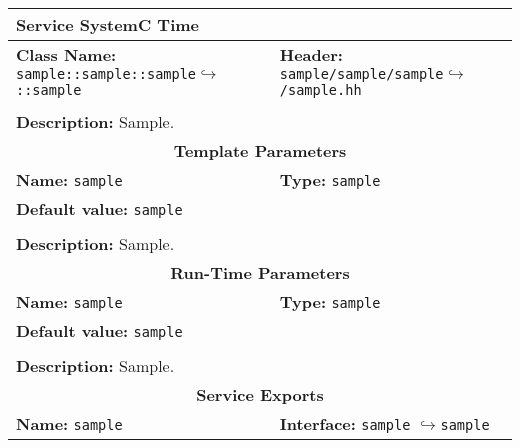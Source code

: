 \newpage
\begin{center}
	\begin{tabular}{|p{7.5cm}|p{7.5cm}|}
		\hline
		\multicolumn{2}{|l|}{\textbf{\Large Service SystemC Time}}\\
		\hline
		\multicolumn{1}{|p{7.5cm}}{\textbf{Class Name:} \newline \texttt{sample::sample::sample}\newline$\hookrightarrow$\texttt{::sample}} & \multicolumn{1}{p{7.5cm}|}{\textbf{Header:} \newline \texttt{sample/sample/sample}\newline$\hookrightarrow$\texttt{/sample.hh}}\\
		\multicolumn{2}{|l|}{}\\
		\multicolumn{2}{|p{15cm}|}{\textbf{Description:} \newline Sample.}\\
		\hline
		\hline
		\multicolumn{2}{|c|}{\textbf{\large Template Parameters}}\\
		\hline
		\multicolumn{1}{|p{7.5cm}}{\textbf{Name:} \texttt{sample}} & \multicolumn{1}{p{7.5cm}|}{\textbf{Type:} \texttt{sample}}\\
		\multicolumn{2}{|p{15cm}|}{\textbf{Default value:} \texttt{sample}}\\
		\multicolumn{2}{|l|}{}\\
		\multicolumn{2}{|p{15cm}|}{\textbf{Description:} \newline Sample.}\\
		\hline
		\hline
		\multicolumn{2}{|c|}{\textbf{\large Run-Time Parameters}}\\
		\hline
		\multicolumn{1}{|p{7.5cm}}{\textbf{Name:} \texttt{sample}} & \multicolumn{1}{p{7.5cm}|}{\textbf{Type:} \texttt{sample}}\\
		\multicolumn{2}{|p{15cm}|}{\textbf{Default value:} \texttt{sample}}\\
		\multicolumn{2}{|l|}{}\\
		\multicolumn{2}{|p{15cm}|}{\textbf{Description:} \newline Sample.}\\
		\hline
		\hline
		\multicolumn{2}{|c|}{\textbf{\large Service Exports}}\\
		\hline
		\multicolumn{1}{|p{7.5cm}}{\textbf{Name:} \texttt{sample}} & \multicolumn{1}{p{7.5cm}|}{\textbf{Interface:} \newline \texttt{sample} \newline$\hookrightarrow$\texttt{sample}}\\

\end{tabular}
\end{center}
